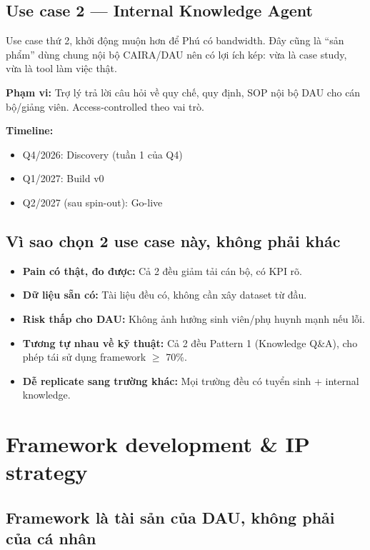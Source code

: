 \documentclass[11pt,a4paper]{article}
\begin{document}
\subsection{Use case 2 — Internal Knowledge Agent}

Use case thứ 2, khởi động muộn hơn để Phú có bandwidth. Đây cũng là ``sản phẩm''
dùng chung nội bộ CAIRA/DAU nên có lợi ích kép: vừa là case study, vừa là tool
làm việc thật.

\textbf{Phạm vi:} Trợ lý trả lời câu hỏi về quy chế, quy định, SOP nội bộ DAU
cho cán bộ/giảng viên. Access-controlled theo vai trò.

\textbf{Timeline:}
\begin{itemize}
\item Q4/2026: Discovery (tuần 1 của Q4)
\item Q1/2027: Build v0
\item Q2/2027 (sau spin-out): Go-live
\end{itemize}

\subsection{Vì sao chọn 2 use case này, không phải khác}

\begin{itemize}
\item \textbf{Pain có thật, đo được:} Cả 2 đều giảm tải cán bộ, có KPI rõ.
\item \textbf{Dữ liệu sẵn có:} Tài liệu đều có, không cần xây dataset từ đầu.
\item \textbf{Risk thấp cho DAU:} Không ảnh hưởng sinh viên/phụ huynh mạnh nếu lỗi.
\item \textbf{Tương tự nhau về kỹ thuật:} Cả 2 đều Pattern 1 (Knowledge Q\&A), cho phép tái sử dụng framework $\geq$ 70\%.
\item \textbf{Dễ replicate sang trường khác:} Mọi trường đều có tuyển sinh + internal knowledge.
\end{itemize}

\clearpage

\section{Framework development \& IP strategy}

\subsection{Framework là tài sản của DAU, không phải của cá nhân}
\end{document}
